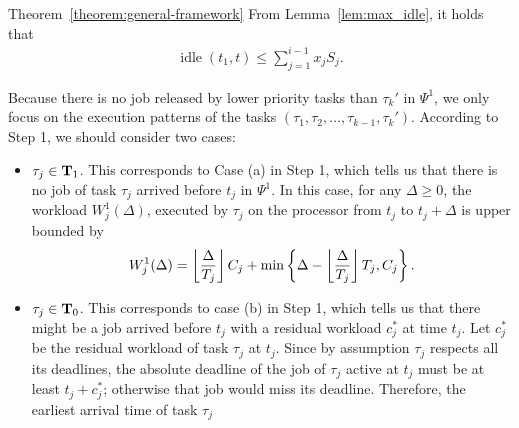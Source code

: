 \begin{appProof}{Theorem~\ref{theorem:general-framework}}
From Lemma~\ref{lem:max_idle}, it holds that
\begin{align}
\label{eq:sumof-sigma}
\operatorname{idle}(t_1, t) \leq \sum_{j=1}^{i-1} x_j S_j.
\end{align}


Because there is no job released by lower priority tasks than
$\tau_k'$ in $\Psi^1$, we only focus on the execution patterns of the
tasks $(\tau_1, \tau_2, \ldots, \tau_{k-1}, \tau_k')$. According to
Step 1, we should consider two cases:
\begin{itemize}
\item $\tau_j \in {\bf T}_1$. This corresponds to Case
  (a) in Step 1, which tells us that there is no job of task $\tau_j$ arrived
  before $t_j$ in $\Psi^1$.   In this case, for any $\Delta \geq 0$, the workload $W_j^1(\Delta)$, executed by
  $\tau_j$ on the processor from $t_j$ to $t_j+\Delta$ is upper bounded by
\begin{equation}
  \label{eq:execution-case1}
  W_j^1(\Delta) = \floor{\frac{\Delta}{T_j}}C_j + \min\left\{\Delta-\floor{\frac{\Delta}{T_j}}T_j, C_j\right\}.
\end{equation}
\item $\tau_j \in {\bf T}_0$. This
  corresponds to case (b) in Step 1, which tells us that there might be a job arrived
  before $t_j$ with a residual workload $c_j^*$ at time $t_j$. %
  Let $c_j^*$ be the residual workload of task $\tau_j$ at $t_j$. 
  Since by assumption $\tau_j$ respects all its deadlines, the absolute deadline of the job of $\tau_j$ active at $t_j$ must be at least $t_j + c_j^*$; otherwise that job would miss its
  deadline. Therefore, the earliest arrival time of task $\tau_j$

\end{itemize}
\end{appProof}
